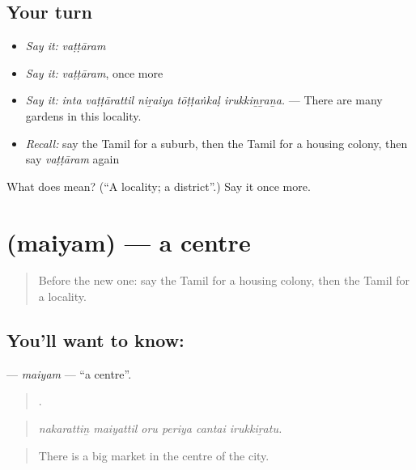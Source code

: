 \subsection*{Your turn}
\begin{itemize}
\raggedright
  \item \emph{Say it:} \emph{vaṭṭāram}
  \item \emph{Say it:} \emph{vaṭṭāram}, once more
  \item \emph{Say it:} \emph{inta vaṭṭārattil niṟaiya tōṭṭaṅkaḷ irukkiṉṟaṉa.} — There are many gardens in this locality.
  \item \emph{Recall:} say the Tamil for a suburb, then the Tamil for a housing colony, then say \emph{vaṭṭāram} again
\end{itemize}

\begin{tcolorbox}[breakable,colback=teal!4,colframe=teal!35!black,title={Before you move on}]
What does  mean? (\textquotedblleft{}A locality; a district\textquotedblright{}.) Say it once more.
\end{tcolorbox}
\section[\texorpdfstring{\ta{மையம்} (maiyam)}{மையம் (maiyam)}]{ (maiyam) — a centre}

\label{lesson:TA-C423-maiyam}



\begin{quote}
Before the new one: say the Tamil for a housing colony, then the Tamil for a locality.
\end{quote}

\subsection*{You'll want to know: }
\textbf{} — \emph{maiyam} — \textquotedblleft{}a centre\textquotedblright{}.

\begin{quote}
     .
\end{quote}

\begin{quote}
\emph{nakarattiṉ maiyattil oru periya cantai irukkiṟatu.}
\end{quote}

\begin{quote}
There is a big market in the centre of the city.
\end{quote}


